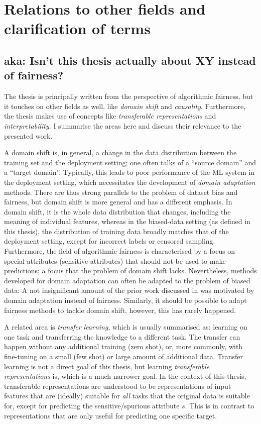 \section{Relations to other fields and clarification of terms}
\subsection{aka: Isn't this thesis actually about XY instead of fairness?}
The thesis is principally written from the perspective of algorithmic fairness,
but it touches on other fields as well, like \emph{domain shift} and \emph{causality}.
Furthermore, the thesis makes use of concepts like \emph{transferable representations}
and \emph{interpretability}.
I summarise the areas here and discuss their relevance to the presented work.

A domain shift is, in general, a change in the data distribution between the training set and the deployment setting;
one often talks of a ``source domain'' and a ``target domain''.
Typically, this leads to poor performance of the \ac{ML} system in the deployment setting,
which necessitates the development of \emph{domain adaptation} methods.
There are thus strong parallels to the problem of dataset bias and fairness,
but domain shift is more general and has a different emphasis.
In domain shift, it is the whole data distribution that changes, including the meaning of individual features,
whereas in the biased-data setting (as defined in this thesis), the distribution of training data broadly matches that of the deployment setting, except for incorrect labels or censored sampling.
Furthermore, the field of algorithmic fairness is characterised by a focus on special attributes (sensitive attributes) that should not be used to make predictions;
a focus that the problem of domain shift lacks.
Nevertheless, methods developed for domain adaptation can often be adapted to the problem of biased data:
A not insignificant amount of the prior work discussed in  was motivated by domain adaptation instead of fairness.
Similarly, it should be possible to adapt fairness methods to tackle domain shift,
however, this has rarely happened.

A related area is \emph{transfer learning},
which is usually summarised as:
learning on one task and transferring the knowledge to a different task.
The transfer can happen without any additional training (zero shot),
or, more commonly, with fine-tuning on a small (few shot) or large amount of additional data.
Transfer learning is not a direct goal of this thesis,
but learning \emph{transferable representations} is,
which is a much narrower goal.
In the context of this thesis,
transferable representations are understood to be representations of input features
that are (ideally) suitable for \emph{all} tasks that the original data is suitable for,
except for predicting the sensitive\slash spurious attribute \(s\).
This is in contrast to representations that are only useful for predicting one specific target.

